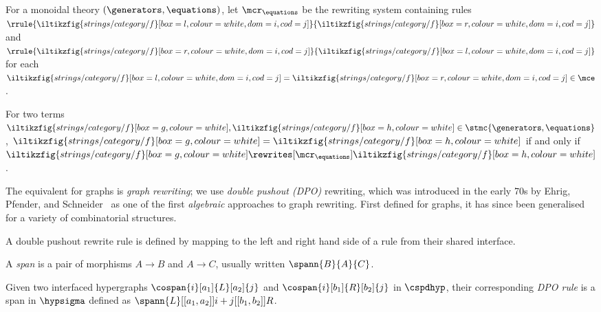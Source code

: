 \begin{definition}
    For a monoidal theory \((\generators,\equations)\), let
    \(\mcr_{\equations}\) be the rewriting system containing rules
    \(\rrule{
        \iltikzfig{strings/category/f}[box=l,colour=white,dom=i,cod=j]
    }{
        \iltikzfig{strings/category/f}[box=r,colour=white,dom=i,cod=j]
    }\) and \(
    \rrule{
        \iltikzfig{strings/category/f}[box=r,colour=white,dom=i,cod=j]
    }{
        \iltikzfig{strings/category/f}[box=l,colour=white,dom=i,cod=j]
    }\) for each \(
    \iltikzfig{strings/category/f}[box=l,colour=white,dom=i,cod=j]
    =
    \iltikzfig{strings/category/f}[box=r,colour=white,dom=i,cod=j]
    \in
    \mce
    \).
\end{definition}

\begin{proposition}
    For two terms \(
    \iltikzfig{strings/category/f}[box=g,colour=white],
    \iltikzfig{strings/category/f}[box=h,colour=white]
    \in \stmc{\generators,\equations}
    \), \(
    \iltikzfig{strings/category/f}[box=g,colour=white]
    =
    \iltikzfig{strings/category/f}[box=h,colour=white]
    \) if and only if \(
    \iltikzfig{strings/category/f}[box=g,colour=white]
    \rewrites[\mcr_{\equations}]
    \iltikzfig{strings/category/f}[box=h,colour=white]
    \).
\end{proposition}

The equivalent for graphs is \emph{graph rewriting}; we use
\emph{double pushout (DPO)} rewriting, which was introduced in the early 70s by
Ehrig, Pfender, and Schneider~\cite{ehrig1973graphgrammars} as one of the first
\emph{algebraic} approaches to graph rewriting.
First defined for graphs, it has since been generalised for a variety of
combinatorial structures.

A double pushout rewrite rule is defined by mapping to the left and right hand
side of a rule from their shared interface.

\begin{definition}[Span]
    A \emph{span} is a pair of morphisms \(A \to B\) and \(A \to C\),
    usually written \(\spann{B}{A}{C}\).
\end{definition}

\begin{definition}\label{def:dpo-rule}
    Given two interfaced hypergraphs \(
    \cospan{i}[a_1]{L}[a_2]{j}
    \) and \(
    \cospan{i}[b_1]{R}[b_2]{j}
    \) in \(\cspdhyp\), their corresponding \emph{DPO rule} is a span in \(\hypsigma\)
    defined as \(
    \spann{L}[[a_1,a_2]]{i + j}[[b_1,b_2]]{R}
    \).
\end{definition}

